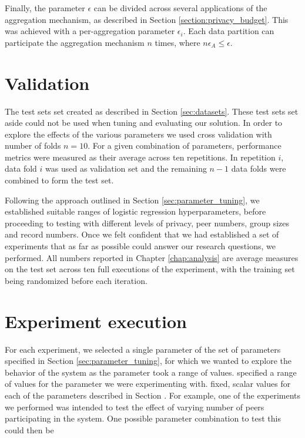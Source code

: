Finally, the parameter $\epsilon$ can be divided across several applications of the aggregation mechanism, as described in Section \ref{section:privacy_budget}. This was achieved with a per-aggregation parameter $\epsilon_i$. Each data partition can participate the aggregation mechanism $n$ times, where $n\epsilon_A \leq \epsilon$.

\section{Validation}

The test sets set created as described in Section \ref{sec:datasets}. These test sets set aside could not be used when tuning and evaluating our solution. In order to explore the effects of the various parameters we used cross validation with number of folds $n=10$. For a given combination of parameters, performance metrics were measured as their average across ten repetitions. In repetition $i$, data fold $i$ was used as validation set and the remaining $n-1$ data folds were combined to form the test set.

Following the approach outlined in Section \ref{sec:parameter_tuning}, we established suitable ranges of logistic regression hyperparameters, before proceeding to testing with different levels of privacy, peer numbers, group sizes and record numbers. Once we felt confident that we had established a set of experiments that as far as possible could answer our research questions, we performed. All numbers reported in Chapter \ref{chap:analysis} are average measures on the test set across ten full executions of the experiment, with the training set being randomized before each iteration.




\section{Experiment execution}

For each experiment, we selected a single parameter of the set of parameters specified in Section \ref{sec:parameter_tuning}, for which we wanted to explore the behavior of the system as the parameter took a range of values. specified a range of values for the parameter we were experimenting with. fixed, scalar values for each of the parameters described in Section . For example, one of the experiments we performed was intended to test the effect of varying number of peers participating in the system. One possible parameter combination to test this could then be

